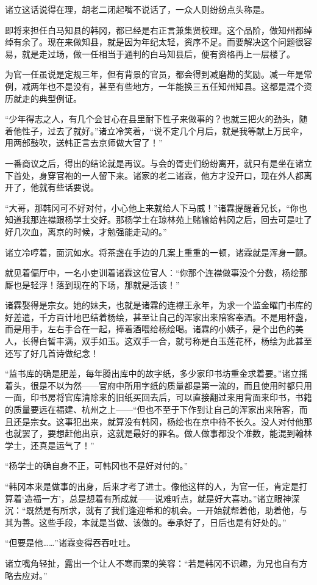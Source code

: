 诸立这话说得在理，胡老二闭起嘴不说话了，一众人则纷纷点头称是。

即将来担任白马知县的韩冈，都已经是右正言兼集贤校理。这个品阶，做知州都绰绰有余了。现在来做知县，就是因为年纪太轻，资序不足。而要解决这个问题很容易，就是走过场，做一任相当于通判的白马知县后，便有资格再上一层楼了。

为官一任虽说是定规三年，但有背景的官员，都会得到减磨勘的奖励。减一年是常例，减两年也不是没有，甚至有些地方，一年能换三五任知州知县。这都是混个资历就走的典型例证。

“少年得志之人，有几个会甘心在县里耐下性子来做事的？也就三把火的劲头，随着他性子，过去了就好。”诸立冷笑着，“说不定几个月后，就是我等献上万民伞，用两部鼓吹，送韩正言去京师做大官了！”

一番商议之后，得出的结论就是再议。与会的胥吏们纷纷离开，就只有是坐在诸立下首处，身穿官袍的一人留下来。诸家的老二诸霖，他方才没开口，现在外人都离开了，他就有些话要说。

“大哥，那韩冈可不好对付，小心他上来就给人下马威！”诸霖提醒着兄长，“你也知道我那连襟跟杨学士交好。那杨学士在琼林苑上赌输给韩冈之后，回去可是吐了好几次血，离京的时候，才勉强能走动的。”

诸立冷哼着，面沉如水。将茶盏在手边的几案上重重的一顿，诸霖就是浑身一颤。

就见着偏厅中，一名小吏训着诸霖这位官人：“你那个连襟做事没个分数，杨绘那厮也是轻浮！落到现在的下场，那就是活该！”

诸霖娶得是宗女。她的妹夫，也就是诸霖的连襟王永年，为求一个监金曜门书库的好差遣，千方百计地巴结着杨绘，甚至让自己的浑家出来陪客奉酒。不是用杯盏，而是用手，左右手合在一起，捧着酒喂给杨绘喝。诸霖的小姨子，是个出色的美人，长得白皙丰满，双手如玉。这双手一合，就号称是白玉莲花杯，杨绘为此甚至还写了好几首诗做纪念！

“监书库的确是肥差，每年腾出库中的故字纸，多少家印书坊重金求着要。”诸立摇着头，很是不以为然——官府中所用字纸的质量都是第一流的，而且使用时都只用一面，印书房将官库清除来的旧纸买回去后，可以直接翻过来用背面来印书，书籍的质量要远在福建、杭州之上——“但也不至于下作到让自己的浑家出来陪客，而且还是宗女。这事犯出来，就算没有韩冈，杨绘也在京中待不长久。没人对付他那也就罢了，要想赶他出京，这就是最好的罪名。做人做事都没个准数，能混到翰林学士，还真是运气了！”

“杨学士的确自身不正，可韩冈也不是好对付的。”

“韩冈本来是做事的出身，后来才考了进士。像他这样的人，为官一任，肯定是打算着‘造福一方’，总是想着有所成就——说难听点，就是好大喜功。”诸立眼神深沉：“既然是有所求，就有了我们逢迎希和的机会。一开始就帮着他，助着他，与其为善。这些手段，本就是当做、该做的。奉承好了，日后也是有好处的。”

“但要是他……”诸霖变得吞吞吐吐。

诸立嘴角轻扯，露出一个让人不寒而栗的笑容：“若是韩冈不识趣，为兄也自有方略去应对。”

